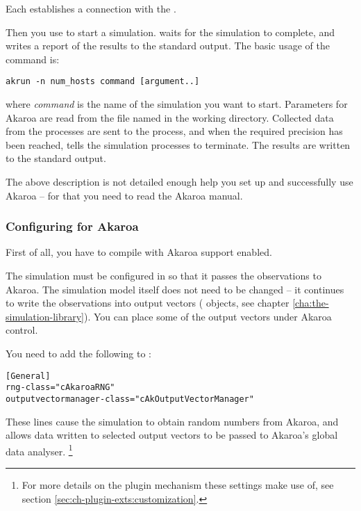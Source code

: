 Each  establishes a connection with the .

Then you use  to start a simulation.  waits
for the simulation to complete, and writes a report of the results
to the standard output. The basic usage of the  command is:

\begin{verbatim}
akrun -n num_hosts command [argument..]
\end{verbatim}

where \textit{command} is the name of the simulation you want to start.
Parameters for Akaroa are read from the file named  in
the working directory. Collected data from the processes are
sent to the  process, and when the required precision
has been reached,  tells the simulation processes to
terminate. The results are written to the standard output.

The above description is not detailed enough help you
set up and successfully use Akaroa -- for that you need to read the
Akaroa manual.

\subsubsection{Configuring {\opp} for Akaroa}

First of all, you have to compile {\opp} with Akaroa support enabled.

The {\opp} simulation must be configured in 
so that it passes the observations to Akaroa. The simulation model itself does
not need to be changed -- it continues to write
the observations into output vectors ( objects,
see chapter \ref{cha:the-simulation-library}). You can place some of
the output vectors under Akaroa control.

You need to add the following to :

\begin{verbatim}
[General]
rng-class="cAkaroaRNG"
outputvectormanager-class="cAkOutputVectorManager"
\end{verbatim}

These lines cause the simulation to obtain random numbers from Akaroa,
and allows data written to selected output vectors to be passed to Akaroa's
global data analyser.
    \footnote{For more details on the plugin mechanism these settings make use of,
    see section \ref{sec:ch-plugin-exts:customization}.}

